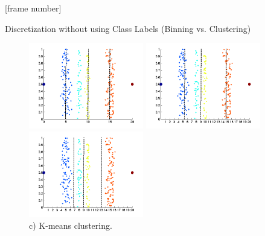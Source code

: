 \documentclass[aspectratio=169,t]{beamer}
\begin{document}
  {
    [frame number]
    \begin{frame}{Discretization without using Class Labels (Binning vs. Clustering)}
    \begin{figure}[H]
        \centering
        \begin{minipage}{0.32\textwidth}
            \includegraphics[width=5cm]{img/binningvsclustering2.png}
            \caption{a) Equal interval width (binning).}
        \end{minipage}
        \begin{minipage}{0.32\textwidth}
            \centering
            \includegraphics[width=5cm]{img/binningvsclustering3.png}
            \caption{b) Equal frequency (binning).}
        \end{minipage}
        \begin{minipage}{0.32\textwidth}
            \centering
            \includegraphics[width=5cm]{img/binningvsclustering4.png}
            \caption{c) K-means clustering.}
        \end{minipage}\hfill
    \end{figure}
    \end{frame}
  }
\end{document}
